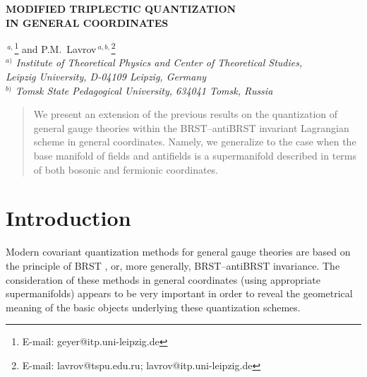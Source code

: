 \documentclass[a4paper,11pt]{article}
\begin{document}
\date{}

\begin{center}
{\Large {\bf MODIFIED TRIPLECTIC QUANTIZATION}}\\
\vspace{.2cm}
{\Large {\bf IN GENERAL COORDINATES}}
\end{center}

{\Large
\begin{center}
$^{\ a,}$\footnote{E-mail:
geyer@itp.uni-leipzig.de} and {\sc P.M.~Lavrov}$^{\ a,b,}$\footnote{E-mail:
lavrov@tspu.edu.ru;
lavrov@itp.uni-leipzig.de}\\

\vspace{.5cm} {\normalsize\it $^{a)}$ Institute of Theoretical
Physics and Center of Theoretical Studies,\\ Leipzig University,
D-04109 Leipzig, Germany}\\  {\normalsize\it $^{b)}$ Tomsk State
Pedagogical University, 634041 Tomsk, Russia}
\end{center}
}
\vspace{.5cm}

\begin{quotation}
\setlength{\baselineskip}{10pt} {\small \noindent }

{\small We present an extension of the previous results \cite{gln} on the
quantization of general gauge theories within the BRST--antiBRST invariant
Lagrangian scheme in general coordinates. Namely, we generalize \cite{gln}
to the case when the base manifold of fields and antifields is a
supermanifold described in terms of both bosonic and fermionic coordinates.
}
\end{quotation}

\section{Introduction}


Modern covariant quantization methods for general gauge theories are based
on the principle of BRST \cite{bv,brst}, or, more generally, BRST--antiBRST
\cite{BLT,3pl,anti,mod3pl} invariance. The consideration of these methods in
general coordinates (using appropriate supermanifolds) appears to be very
important in order to reveal the geometrical meaning of the basic objects
underlying these quantization schemes.
\end{document}
